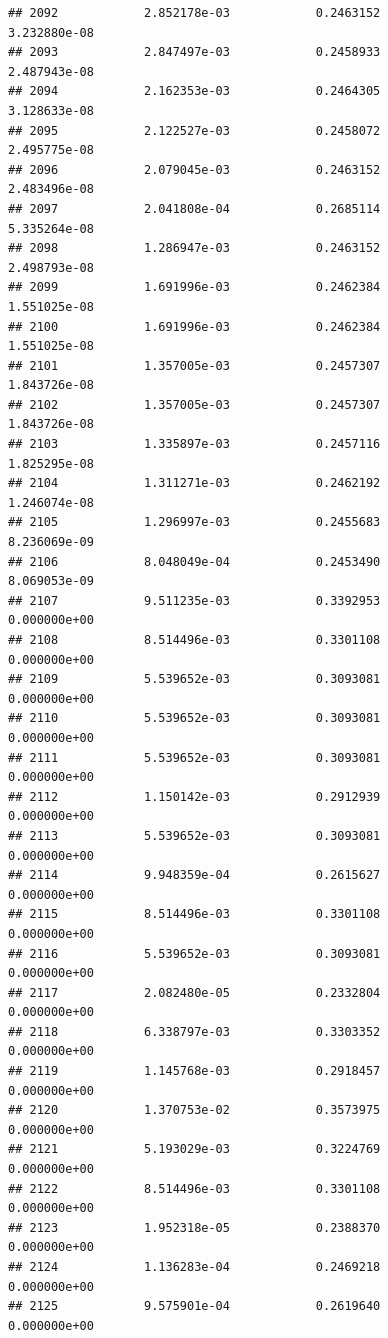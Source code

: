 \documentclass[
]{article}
\begin{document}
\begin{verbatim}
## 2092            2.852178e-03            0.2463152            3.232880e-08
## 2093            2.847497e-03            0.2458933            2.487943e-08
## 2094            2.162353e-03            0.2464305            3.128633e-08
## 2095            2.122527e-03            0.2458072            2.495775e-08
## 2096            2.079045e-03            0.2463152            2.483496e-08
## 2097            2.041808e-04            0.2685114            5.335264e-08
## 2098            1.286947e-03            0.2463152            2.498793e-08
## 2099            1.691996e-03            0.2462384            1.551025e-08
## 2100            1.691996e-03            0.2462384            1.551025e-08
## 2101            1.357005e-03            0.2457307            1.843726e-08
## 2102            1.357005e-03            0.2457307            1.843726e-08
## 2103            1.335897e-03            0.2457116            1.825295e-08
## 2104            1.311271e-03            0.2462192            1.246074e-08
## 2105            1.296997e-03            0.2455683            8.236069e-09
## 2106            8.048049e-04            0.2453490            8.069053e-09
## 2107            9.511235e-03            0.3392953            0.000000e+00
## 2108            8.514496e-03            0.3301108            0.000000e+00
## 2109            5.539652e-03            0.3093081            0.000000e+00
## 2110            5.539652e-03            0.3093081            0.000000e+00
## 2111            5.539652e-03            0.3093081            0.000000e+00
## 2112            1.150142e-03            0.2912939            0.000000e+00
## 2113            5.539652e-03            0.3093081            0.000000e+00
## 2114            9.948359e-04            0.2615627            0.000000e+00
## 2115            8.514496e-03            0.3301108            0.000000e+00
## 2116            5.539652e-03            0.3093081            0.000000e+00
## 2117            2.082480e-05            0.2332804            0.000000e+00
## 2118            6.338797e-03            0.3303352            0.000000e+00
## 2119            1.145768e-03            0.2918457            0.000000e+00
## 2120            1.370753e-02            0.3573975            0.000000e+00
## 2121            5.193029e-03            0.3224769            0.000000e+00
## 2122            8.514496e-03            0.3301108            0.000000e+00
## 2123            1.952318e-05            0.2388370            0.000000e+00
## 2124            1.136283e-04            0.2469218            0.000000e+00
## 2125            9.575901e-04            0.2619640            0.000000e+00

\end{verbatim}
\end{document}
